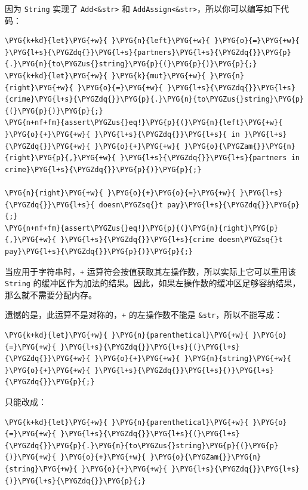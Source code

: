 因为 \texttt{String} 实现了 \texttt{Add<\&str>} 和 \texttt{AddAssign<\&str>}，所以你可以编写如下代码：

\begin{Verbatim}[commandchars=\\\{\},breaklines=true,breakanywhere=true,fontsize=\codefont,xleftmargin=17bp]
\PYG{k+kd}{let}\PYG{+w}{ }\PYG{n}{left}\PYG{+w}{ }\PYG{o}{=}\PYG{+w}{ }\PYG{l+s}{\PYGZdq{}}\PYG{l+s}{partners}\PYG{l+s}{\PYGZdq{}}\PYG{p}{.}\PYG{n}{to\PYGZus{}string}\PYG{p}{(}\PYG{p}{)}\PYG{p}{;}
\PYG{k+kd}{let}\PYG{+w}{ }\PYG{k}{mut}\PYG{+w}{ }\PYG{n}{right}\PYG{+w}{ }\PYG{o}{=}\PYG{+w}{ }\PYG{l+s}{\PYGZdq{}}\PYG{l+s}{crime}\PYG{l+s}{\PYGZdq{}}\PYG{p}{.}\PYG{n}{to\PYGZus{}string}\PYG{p}{(}\PYG{p}{)}\PYG{p}{;}
\PYG{n+nf+fm}{assert\PYGZus{}eq!}\PYG{p}{(}\PYG{n}{left}\PYG{+w}{ }\PYG{o}{+}\PYG{+w}{ }\PYG{l+s}{\PYGZdq{}}\PYG{l+s}{ in }\PYG{l+s}{\PYGZdq{}}\PYG{+w}{ }\PYG{o}{+}\PYG{+w}{ }\PYG{o}{\PYGZam{}}\PYG{n}{right}\PYG{p}{,}\PYG{+w}{ }\PYG{l+s}{\PYGZdq{}}\PYG{l+s}{partners in crime}\PYG{l+s}{\PYGZdq{}}\PYG{p}{)}\PYG{p}{;}

\PYG{n}{right}\PYG{+w}{ }\PYG{o}{+}\PYG{o}{=}\PYG{+w}{ }\PYG{l+s}{\PYGZdq{}}\PYG{l+s}{ doesn\PYGZsq{}t pay}\PYG{l+s}{\PYGZdq{}}\PYG{p}{;}
\PYG{n+nf+fm}{assert\PYGZus{}eq!}\PYG{p}{(}\PYG{n}{right}\PYG{p}{,}\PYG{+w}{ }\PYG{l+s}{\PYGZdq{}}\PYG{l+s}{crime doesn\PYGZsq{}t pay}\PYG{l+s}{\PYGZdq{}}\PYG{p}{)}\PYG{p}{;}
\end{Verbatim}

当应用于字符串时，\texttt{+} 运算符会按值获取其左操作数，所以实际上它可以重用该 \texttt{String} 的缓冲区作为加法的结果。因此，如果左操作数的缓冲区足够容纳结果，那么就不需要分配内存。

遗憾的是，此运算不是对称的，\texttt{+} 的左操作数不能是 \texttt{\&str}，所以不能写成：

\begin{Verbatim}[commandchars=\\\{\},breaklines=true,breakanywhere=true,fontsize=\codefont,xleftmargin=17bp]
\PYG{k+kd}{let}\PYG{+w}{ }\PYG{n}{parenthetical}\PYG{+w}{ }\PYG{o}{=}\PYG{+w}{ }\PYG{l+s}{\PYGZdq{}}\PYG{l+s}{(}\PYG{l+s}{\PYGZdq{}}\PYG{+w}{ }\PYG{o}{+}\PYG{+w}{ }\PYG{n}{string}\PYG{+w}{ }\PYG{o}{+}\PYG{+w}{ }\PYG{l+s}{\PYGZdq{}}\PYG{l+s}{)}\PYG{l+s}{\PYGZdq{}}\PYG{p}{;}
\end{Verbatim}

只能改成：

\begin{Verbatim}[commandchars=\\\{\},breaklines=true,breakanywhere=true,fontsize=\codefont,xleftmargin=17bp]
\PYG{k+kd}{let}\PYG{+w}{ }\PYG{n}{parenthetical}\PYG{+w}{ }\PYG{o}{=}\PYG{+w}{ }\PYG{l+s}{\PYGZdq{}}\PYG{l+s}{(}\PYG{l+s}{\PYGZdq{}}\PYG{p}{.}\PYG{n}{to\PYGZus{}string}\PYG{p}{(}\PYG{p}{)}\PYG{+w}{ }\PYG{o}{+}\PYG{+w}{ }\PYG{o}{\PYGZam{}}\PYG{n}{string}\PYG{+w}{ }\PYG{o}{+}\PYG{+w}{ }\PYG{l+s}{\PYGZdq{}}\PYG{l+s}{)}\PYG{l+s}{\PYGZdq{}}\PYG{p}{;}
\end{Verbatim}

